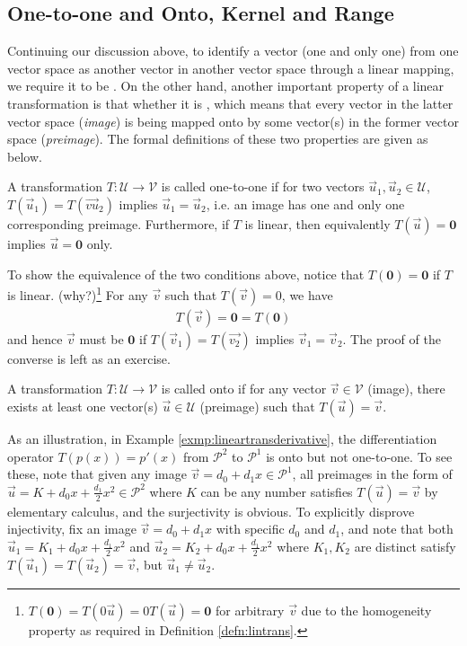 \subsection{One-to-one and Onto, Kernel and Range}

Continuing our discussion above, to identify a vector (one and only one) from one vector space as another vector in another vector space through a linear mapping, we require it to be . On the other hand, another important property of a linear transformation is that whether it is , which means that every vector in the latter vector space (\textit{image}) is being mapped onto by some vector(s) in the former vector space (\textit{preimage}). The formal definitions of these two properties are given as below.

\begin{proper}
\label{proper:injective}
A transformation $T: \mathcal{U} \to \mathcal{V}$ is called one-to-one if for two vectors $\vec{u}_1, \vec{u}_2 \in \mathcal{U}$, $T(\vec{u}_1) = T(\vec{vu}_2)$ implies $\vec{u}_1 = \vec{u}_2$, i.e. an image has one and only one corresponding preimage. Furthermore, if $T$ is linear, then equivalently $T(\vec{u}) = \textbf{0}$ implies $\vec{u} = \textbf{0}$ only.
\end{proper}
To show the equivalence of the two conditions above, notice that $T(\textbf{0}) = \textbf{0}$ if $T$ is linear. (why?)\footnote{$T(\textbf{0})=T(0\vec{u})=0T(\vec{u})=\textbf{0}$ for arbitrary $\vec{v}$ due to the homogeneity property as required in Definition \ref{defn:lintrans}.} For any $\vec{v}$ such that $T(\vec{v}) = 0$, we have
\begin{align*}
T(\vec{v}) = \textbf{0} = T(\textbf{0})
\end{align*}
and hence $\vec{v}$ must be $\textbf{0}$ if $T(\vec{v}_1) = T(\vec{v_2})$ implies $\vec{v}_1 = \vec{v}_2$. The proof of the converse is left as an exercise.
\begin{proper}
\label{proper:surjective}
A transformation $T: \mathcal{U} \to \mathcal{V}$ is called onto if for any vector $\vec{v} \in \mathcal{V}$ (image), there exists at least one vector(s) $\vec{u} \in \mathcal{U}$ (preimage) such that $T(\vec{u}) = \vec{v}$.
\end{proper}
As an illustration, in Example \ref{exmp:lineartransderivative}, the differentiation operator $T(p(x)) = p'(x)$ from $\mathcal{P}^2$ to $\mathcal{P}^1$ is onto but not one-to-one. To see these, note that given any image $\vec{v} = d_0 + d_1x \in \mathcal{P}^1$, all preimages in the form of $\vec{u} = K + d_0x + \frac{d_1}{2}x^2\in \mathcal{P}^2$ where $K$ can be any number satisfies $T(\vec{u}) = \vec{v}$ by elementary calculus, and the surjectivity is obvious. To explicitly disprove injectivity, fix an image $\vec{v} = d_0 + d_1x$ with specific $d_0$ and $d_1$, and note that both $\vec{u}_1 = K_1 + d_0x + \frac{d_1}{2}x^2$ and $\vec{u}_2 = K_2 + d_0x + \frac{d_1}{2}x^2$ where $K_1, K_2$ are distinct satisfy $T(\vec{u}_1) = T(\vec{u}_2) = \vec{v}$, but $\vec{u}_1 \neq \vec{u}_2$.

